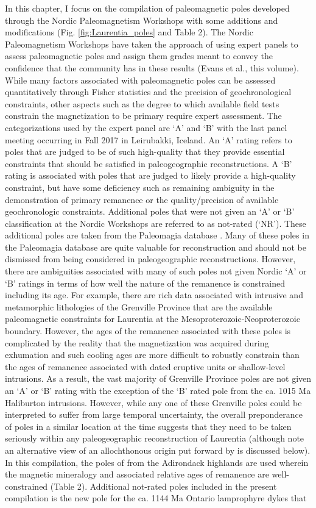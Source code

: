 \documentclass[11pt,letterpaper]{article}
\begin{document}
In this chapter, I focus on the compilation of paleomagnetic poles developed through the Nordic Paleomagnetism Workshops with some additions and modifications (Fig. \ref{fig:Laurentia_poles} and Table 2). The Nordic Paleomagnetism Workshops have taken the approach of using expert panels to assess paleomagnetic poles and assign them grades meant to convey the confidence that the community has in these results (Evans et al., this volume). While many factors associated with paleomagnetic poles can be assessed quantitatively through Fisher statistics and the precision of geochronological constraints, other aspects such as the degree to which available field tests constrain the magnetization to be primary require expert assessment. The categorizations used by the expert panel are `A' and `B' with the last panel meeting occurring in Fall 2017 in Leirubakki, Iceland. An `A' rating refers to poles that are judged to be of such high-quality that they provide essential constraints that should be satisfied in paleogeographic reconstructions. A `B' rating is associated with poles that are judged to likely provide a high-quality constraint, but have some deficiency such as remaining ambiguity in the demonstration of primary remanence or the quality/precision of available geochronologic constraints. Additional poles that were not given an `A' or `B' classification at the Nordic Workshops are referred to as not-rated (`NR'). These additional poles are taken from the Paleomagia database \citep{Veikkolainen2014a}. Many of these poles in the Paleomagia database are quite valuable for reconstruction and should not be dismissed from being considered in paleogeographic reconstructions. However, there are ambiguities associated with many of such poles not given Nordic `A' or `B' ratings in terms of how well the nature of the remanence is constrained including its age. For example, there are rich data associated with intrusive and metamorphic lithologies of the Grenville Province that are the available paleomagnetic constraints for Laurentia at the Mesoproterozoic-Neoproterozoic boundary. However, the ages of the remanence associated with these poles is complicated by the reality that the magnetization was acquired during exhumation and such cooling ages are more difficult to robustly constrain than the ages of remanence associated with dated eruptive units or shallow-level intrusions. As a result, the vast majority of Grenville Province poles are not given an `A' or `B' rating with the exception of the `B' rated pole from the ca. 1015 Ma Haliburton intrusions. However, while any one of these Grenville poles could be interpreted to suffer from large temporal uncertainty, the overall preponderance of poles in a similar location at the time suggests that they need to be taken seriously within any paleogeographic reconstruction of Laurentia (although note an alternative view of an allochthonous origin put forward by \citet{Halls2015a} is discussed below). In this compilation, the poles of \cite{Brown2012a} from the Adirondack highlands are used wherein the magnetic mineralogy and associated relative ages of remanence are well-constrained (Table 2). Additional not-rated poles included in the present compilation is the new pole for the ca. 1144 Ma Ontario lamprophyre dykes \citep{Piispa2018a} that 
\end{document}
